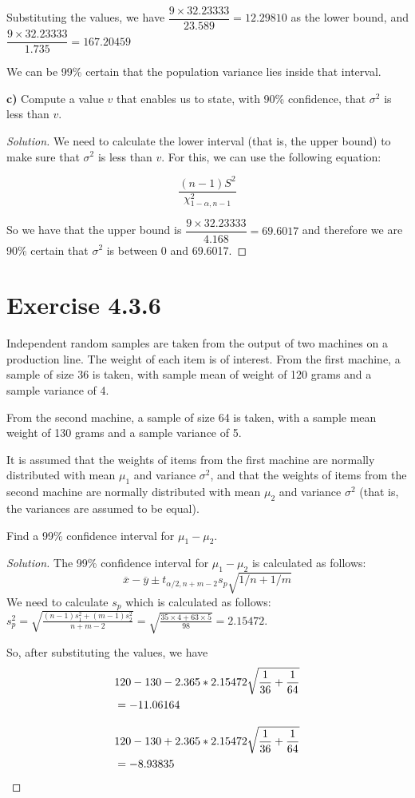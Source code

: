 \documentclass[titlepage, letterpaper]{article} %
\newcommand{\spacepls}{\vspace{5mm}}
\renewcommand\qedsymbol{\(\blacksquare\)}
\newenvironment{solution}
{\renewcommand\qedsymbol{$\square$}\begin{proof}[Solution]}
{\end{proof}}
\begin{document}
Substituting the values, we have $\dfrac{9 \times 32.23333}{23.589} = 12.29810$ as the lower bound,
and $\dfrac{9 \times 32.23333}{1.735} = 167.20459$

We can be 99\% certain that the population variance lies inside that interval.

\spacepls

{\large \textbf{c)} Compute a value $v$ that enables us to state, with 90\% confidence, that $\sigma^2$ is less than $v$.}

\begin{solution}
We need to calculate the lower interval (that is, the upper bound) to make sure that $\sigma^2$ is less than $v$.
For this, we can use the following equation:

\[\frac{(n-1)S^2}{\chi_{1-\alpha,n-1}^2}\]

So we have that the upper bound is $\dfrac{9 \times 32.23333}{4.168} = 69.6017$ and therefore we are 90\% certain that $\sigma^2$ is between 0 and 69.6017.
\end{solution}

\spacepls

\section{Exercise 4.3.6}

{\large Independent random samples are taken from the output of two machines on a production line.
The weight of each item is of interest.
From the first machine, a sample of size 36 is taken, with sample mean of weight of 120 grams and a sample variance of 4.

From the second machine, a sample of size 64 is taken, with a sample mean weight of 130 grams and a sample variance of 5.

It is assumed that the weights of items from the first machine are normally distributed with mean $\mu_1$ and variance $\sigma^2$, and that the weights of items from the second machine are normally distributed with mean $\mu_2$ and variance $\sigma^2$ (that is, the variances are assumed to be equal).

Find a 99\% confidence interval for $\mu_1 - \mu_2$.}

\begin{solution}
The 99\% confidence interval for $\mu_1 - \mu_2$ is calculated as follows:
\[\overline{x} - \overline{y} \pm t_{\alpha /2,n+m-2}{s_p}\sqrt{1/n + 1/m}\]
We need to calculate $s_p$ which is calculated as follows: $s^2_p = \sqrt{\frac{(n-1)s^2_1 + (m-1)s^2_2}{n+m-2}} = \sqrt{\frac{35 \times 4 + 63 \times 5}{98}} = 2.15472$.

So, after substituting the values, we have
\begin{align*}
& 120 - 130 - 2.365 * 2.15472\sqrt{\frac{1}{36}+\frac{1}{64}} \\
& = -11.06164\\[2ex]
& 120 - 130 + 2.365 * 2.15472\sqrt{\frac{1}{36}+\frac{1}{64}} \\
& = -8.93835 \qedhere
\end{align*}
\end{solution}
\end{document}
